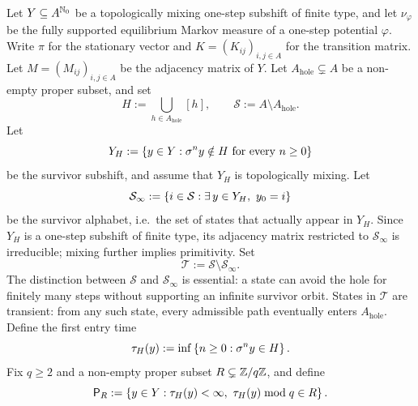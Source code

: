 \begin{theorem}
\label{thm:first-entry-escape-rate}
Let \(Y\subseteq A^{\mathbb{N}_0}\) be a topologically mixing one-step
subshift of finite type, and let \(\nu_\varphi\) be the fully supported
equilibrium Markov measure of a one-step potential \(\varphi\).  Write
\(\pi\) for the stationary vector and \(K=(K_{ij})_{i,j\in A}\) for the
transition matrix.  Let \(M=(M_{ij})_{i,j\in A}\) be the adjacency
matrix of \(Y\).  Let \(A_{\mathrm{hole}}\subsetneq A\) be a non-empty proper
subset, and set
\[
  H:=\bigcup_{h\in A_{\mathrm{hole}}}[h],
  \qquad
  \mathcal S:=A\setminus A_{\mathrm{hole}}.
\]
Let
\[
  Y_H:=\left\{y\in Y:\sigma^n y\notin H\text{ for every }n\geq 0\right\}
\]
be the survivor subshift, and assume that \(Y_H\) is topologically
mixing.  Let
\[
  \mathcal S_\infty
  := \left\{i\in\mathcal S:\exists\,y\in Y_H,\ y_0=i\right\}
\]
be the survivor alphabet, i.e.\ the set of states that actually appear
in \(Y_H\).  Since \(Y_H\) is a one-step subshift of finite type, its
adjacency matrix restricted to \(\mathcal S_\infty\) is irreducible;
mixing further implies primitivity.  Set
\[
  \mathcal T:=\mathcal S\setminus\mathcal S_\infty.
\]
The distinction between \(\mathcal S\) and \(\mathcal S_\infty\) is
essential: a state can avoid the hole for finitely many steps without
supporting an infinite survivor orbit.
States in \(\mathcal T\) are transient: from any such state, every
admissible path eventually enters \(A_{\mathrm{hole}}\).
Define the first entry time
\[
  \tau_H(y):=\inf\left\{n\geq 0:\sigma^n y\in H\right\}.
\]
Fix \(q\geq 2\) and a non-empty proper subset
\(R\subsetneq \mathbb{Z}/q\mathbb{Z}\), and define
\[
  \mathsf{P}_R
  := \left\{y\in Y:
      \tau_H(y)<\infty,\
      \tau_H(y)\bmod q\in R \right\}.
\]


\end{theorem}
